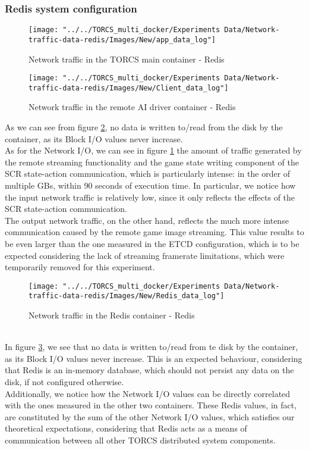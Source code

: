 \subsubsection{Redis system configuration}
\begin{figure}[h!]
	\centering
	\texttt{[image: "../../TORCS\_multi\_docker/Experiments Data/Network-traffic-data-redis/Images/New/app\_data\_log"]}
	\caption[Network traffic in the TORCS application container - Redis]{Network traffic in the TORCS main container - Redis}
	\label{fig:appdatalogredis}
\end{figure}
\begin{figure}[h!]
	\centering
	\texttt{[image: "../../TORCS\_multi\_docker/Experiments Data/Network-traffic-data-redis/Images/New/Client\_data\_log"]}
	\caption[Network traffic in the remote AI driver container - Redis]{Network traffic in the remote AI driver container - Redis}
	\label{fig:clientdatalogredis}
\end{figure}
As we can see from figure \ref{fig:clientdatalogredis}, no data is written to/read from the disk by the container, as its Block I/O values never increase. \\
As for the Network I/O, we can see in figure \ref{fig:appdatalogredis} the amount of traffic generated by the remote streaming functionality and the game state writing component of the SCR state-action communication, which is particularly intense: in the order of multiple GBs, within 90 seconds of execution time. In particular, we notice how the input network traffic is relatively low, since it only reflects the effects of the SCR state-action communication. \\ 
The output network traffic, on the other hand, reflects the much more intense communication caused by the remote game image streaming. This value results to be even larger than the one measured in the ETCD configuration, which is to be expected considering the lack of streaming framerate limitations, which were temporarily removed for this experiment.
\begin{figure}[h!]
	\centering
	\texttt{[image: "../../TORCS\_multi\_docker/Experiments Data/Network-traffic-data-redis/Images/New/Redis\_data\_log"]}
	\caption[Network traffic in the Redis container - Redis]{Network traffic in the Redis container - Redis}
	\label{fig:redisdatalog}
\end{figure}
\\ In figure \ref{fig:redisdatalog}, we see that no data is written to/read from te disk by the container, as its Block I/O values never increase. This is an expected behaviour, considering that Redis is an in-memory database, which should not persist any data on the disk, if not configured otherwise. \\
Additionally, we notice how the Network I/O values can be directly correlated with the ones measured in the other two containers. These Redis values, in fact, are constituted by the sum of the other Network I/O values, which satisfies our theoretical expectations, considering that Redis acts as a means of communication between all other TORCS distributed system components.

